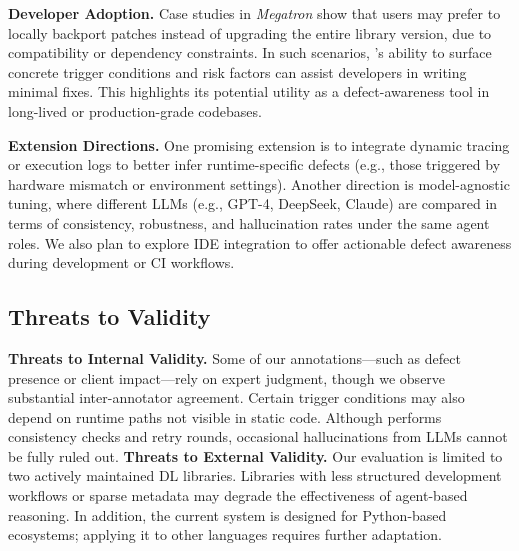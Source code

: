 \noindent \textbf{Developer Adoption.}
Case studies in \textit{Megatron} show that users may prefer to locally backport patches instead of upgrading the entire library version, due to compatibility or dependency constraints. 
In such scenarios, \appname’s ability to surface concrete trigger conditions and risk factors can assist developers in writing minimal fixes. 
This highlights its potential utility as a defect-awareness tool in long-lived or production-grade codebases.

\noindent\textbf{Extension Directions.}
One promising extension is to integrate dynamic tracing or execution logs to better infer runtime-specific defects (e.g., those triggered by hardware mismatch or environment settings).
Another direction is model-agnostic tuning, where different LLMs (e.g., GPT-4, DeepSeek, Claude) are compared in terms of consistency, robustness, and hallucination rates under the same agent roles.
We also plan to explore IDE integration to offer actionable defect awareness during development or CI workflows.


\subsection{Threats to Validity}
\textbf{Threats to Internal Validity.} Some of our annotations—such as defect presence or client impact—rely on expert judgment, though we observe substantial inter-annotator agreement.
Certain trigger conditions may also depend on runtime paths not visible in static code.
Although \appname performs consistency checks and retry rounds, occasional hallucinations from LLMs cannot be fully ruled out.
\textbf{Threats to External Validity.} Our evaluation is limited to two actively maintained DL libraries.
Libraries with less structured development workflows or sparse metadata may degrade the effectiveness of agent-based reasoning.
In addition, the current system is designed for Python-based ecosystems; applying it to other languages requires further adaptation.
